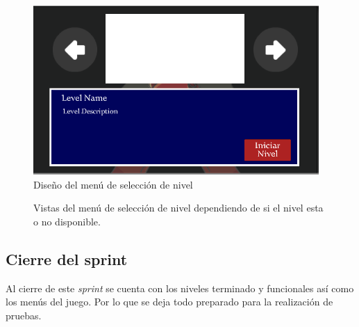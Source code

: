 \begin{figure}[h]
		\centering
		\includegraphics[height=0.2 \textheight]{03TrabajoRealizado/imagenes/menuctrlPanel04.png}
		\caption{Diseño del menú de selección de nivel}
		\label{fig:menuSelectIntefaz}
\end{figure}


\begin{figure}
  \centering
   
 	
  \caption{Vistas del menú de selección de nivel dependiendo de si el nivel esta o no disponible.}
  \label{fig:MenuSelect}
\end{figure} 

\subsection{Cierre del sprint}
Al cierre de este \textit{sprint} se cuenta con los niveles terminado y funcionales 
así como los menús del juego. Por lo que se deja todo preparado para la realización 
de pruebas.